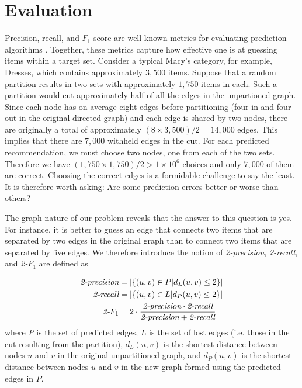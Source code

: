 \documentclass[11pt]{article}
\begin{document}
\section*{Evaluation}
Precision, recall, and $F_1$ score are well-known metrics for evaluating
prediction algorithms \cite{Powers2011}. Together, these metrics capture how
effective one is at guessing items within a target set. Consider a typical
Macy's category, for example, Dresses, which contains approximately $3,500$
items. Suppose that a random partition results in two sets with approximately
$1,750$ items in each. Such a partition would cut approximately half of all the
edges in the unpartioned graph. Since each node has on average eight edges
before partitioning (four in and four out in the original directed graph) and
each edge is shared by two nodes, there are originally a total of approximately
$\left(8 \times 3,500\right) / 2 = 14,000$ edges. This implies that there are
$7,000$ withheld edges in the cut. For each predicted recommendation, we must
choose two nodes, one from each of the two sets. Therefore we have $\left(1,750
\times 1,750\right)/2 > 1 \times 10^6$ choices and only $7,000$ of them are
correct. Choosing the correct edges is a formidable challenge to say the least.
It is therefore worth asking: Are some prediction errors better or worse than
others?

The graph nature of our problem reveals that the answer to this question is yes.
For instance, it is better to guess an edge that connects two items that are
separated by two edges in the original graph than to connect two items that are
separated by five edges. We therefore introduce the notion of {\em 2-precision},
{\em 2-recall}, and {\em 2-}$F_1$ are defined as

\begin{align}
\text{\em 2-precision} &= \left|\left\{(u,v) \in P | d_L(u,v) \leq 2
\right\}\right|
\\\text{\em 2-recall} &= \left|\left\{(u,v) \in L | d_P(u,v) \leq 2
\right\}\right|
\\\text{\em 2-}F_1 &= 2\cdot \frac{\text{\em 2-precision} \cdot \text{\em
2-recall}}{\text{\em 2-precision} + \text{\em 2-recall}}
\end{align}
where $P$ is the set of predicted edges, $L$ is the set of lost edges (i.e.
those in the cut resulting from the partition), $d_L(u,v)$ is the shortest
distance between nodes $u$ and $v$ in the original unpartitioned graph, and
$d_P(u,v)$ is the shortest distance between nodes $u$ and $v$ in the new graph
formed using the predicted edges in $P$.
\end{document}
